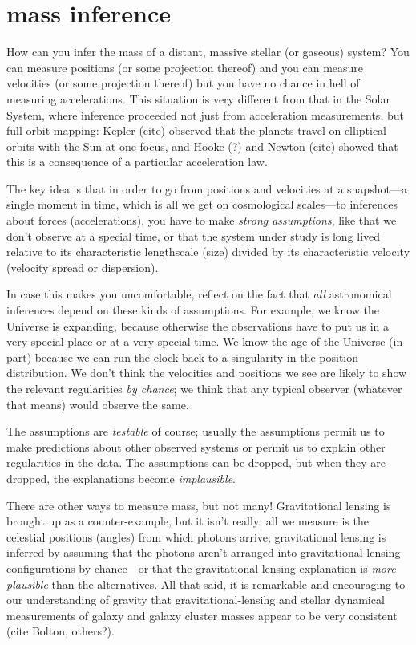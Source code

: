 \documentclass[12pt]{article}
\begin{document}
\section{mass inference}

How can you infer the mass of a distant, massive stellar (or gaseous)
system?  You can measure positions (or some projection thereof) and
you can measure velocities (or some projection thereof) but you have
no chance in hell of measuring accelerations.  This situation is very
different from that in the Solar System, where inference proceeded not
just from acceleration measurements, but full orbit mapping: Kepler
(cite) observed that the planets travel on elliptical orbits with the
Sun at one focus, and Hooke (?) and Newton (cite) showed that this is
a consequence of a particular acceleration law.

The key idea is that in order to go from positions and velocities at a
snapshot---a single moment in time, which is all we get on
cosmological scales---to inferences about forces (accelerations), you
have to make \emph{strong assumptions}, like that we don't observe at
a special time, or that the system under study is long lived relative
to its characteristic lengthscale (size) divided by its characteristic
velocity (velocity spread or dispersion).

In case this makes you uncomfortable, reflect on the fact that
\emph{all} astronomical inferences depend on these kinds of
assumptions.  For example, we know the Universe is expanding, because
otherwise the observations have to put us in a very special place or
at a very special time.  We know the age of the Universe (in part)
because we can run the clock back to a singularity in the position
distribution.  We don't think the velocities and positions we see are
likely to show the relevant regularities \emph{by chance}; we think
that any typical observer (whatever that means) would observe the
same.

The assumptions are \emph{testable} of course; usually the assumptions
permit us to make predictions about other observed systems or permit
us to explain other regularities in the data.  The assumptions can be
dropped, but when they are dropped, the explanations become
\emph{implausible}.

There are other ways to measure mass, but not many!  Gravitational
lensing is brought up as a counter-example, but it isn't really; all
we measure is the celestial positions (angles) from which photons
arrive; gravitational lensing is inferred by assuming that the photons
aren't arranged into gravitational-lensing configurations by
chance---or that the gravitational lensing explanation is \emph{more
  plausible} than the alternatives.  All that said, it is remarkable
and encouraging to our understanding of gravity that
gravitational-lensihg and stellar dynamical measurements of galaxy and
galaxy cluster masses appear to be very consistent (cite Bolton,
others?).
\end{document}
